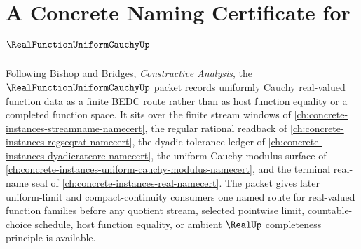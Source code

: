\chapter{A Concrete Naming Certificate for $\RealFunctionUniformCauchyUp$}
\label{ch:concrete-instances-real-function-uniform-cauchy-namecert}

Following Bishop and Bridges, \emph{Constructive Analysis}, the $\RealFunctionUniformCauchyUp$ packet records uniformly Cauchy real-valued function data as a finite BEDC route rather than as host function equality or a completed function space. It sits over the finite stream windows of \autoref{ch:concrete-instances-streamname-namecert}, the regular rational readback of \autoref{ch:concrete-instances-regseqrat-namecert}, the dyadic tolerance ledger of \autoref{ch:concrete-instances-dyadicratcore-namecert}, the uniform Cauchy modulus surface of \autoref{ch:concrete-instances-uniform-cauchy-modulus-namecert}, and the terminal real-name seal of \autoref{ch:concrete-instances-real-namecert}. The packet gives later uniform-limit and compact-continuity consumers one named route for real-valued function families before any quotient stream, selected pointwise limit, countable-choice schedule, host function equality, or ambient $\RealUp$ completeness principle is available.

